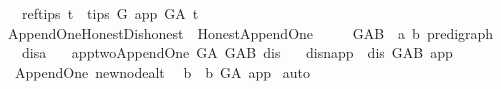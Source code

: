 \begin{isabellebody}
\ \ \ ref{\isacharunderscore}{\kern0pt}tips{\isacharcolon}{\kern0pt}\ {\isachardoublequoteopen}{\isasymforall}t\ {\isasymin}\ tips\ G{\isachardot}{\kern0pt}\ app\ {\isasymrightarrow}\isactrlbsub G{\isacharunderscore}{\kern0pt}A\isactrlesub \ t{\isachardoublequoteclose}\ \ \isanewline
\isanewline
\isanewline
{}\isamarkupfalse%
\ Append{\isacharunderscore}{\kern0pt}One{\isacharunderscore}{\kern0pt}Honest{\isacharunderscore}{\kern0pt}Dishonest\ {\isacharequal}{\kern0pt}\ Honest{\isacharunderscore}{\kern0pt}Append{\isacharunderscore}{\kern0pt}One\ {\isacharplus}{\kern0pt}\ \isanewline
\ \ \ G{\isacharunderscore}{\kern0pt}AB\ {\isacharcolon}{\kern0pt}{\isacharcolon}{\kern0pt}\ {\isachardoublequoteopen}{\isacharparenleft}{\kern0pt}{\isacharprime}{\kern0pt}a{\isacharcomma}{\kern0pt}\ {\isacharprime}{\kern0pt}b{\isacharparenright}{\kern0pt}\ pre{\isacharunderscore}{\kern0pt}digraph{\isachardoublequoteclose}\ {\isacharparenleft}{\kern0pt}\isanewline
\ \ \ dis{\isacharcolon}{\kern0pt}{\isacharcolon}{\kern0pt}{\isacharprime}{\kern0pt}a\isanewline
\ \ \ app{\isacharunderscore}{\kern0pt}two{\isacharcolon}{\kern0pt}{\isachardoublequoteopen}Append{\isacharunderscore}{\kern0pt}One\ G{\isacharunderscore}{\kern0pt}A\ G{\isacharunderscore}{\kern0pt}AB\ dis{\isachardoublequoteclose}\isanewline
\ \ \ dis{\isacharunderscore}{\kern0pt}n{\isacharunderscore}{\kern0pt}app{\isacharcolon}{\kern0pt}\ {\isachardoublequoteopen}{\isasymnot}\ dis\ {\isasymrightarrow}\isactrlbsub G{\isacharunderscore}{\kern0pt}AB\isactrlesub \ app{\isachardoublequoteclose}%
\isadelimdocument
%
\endisadelimdocument
%
\isatagdocument
%
\isamarkuptrue%
%
\endisatagdocument
{\isafolddocument}%
%
\isadelimdocument
%
\endisadelimdocument
{}\isamarkupfalse%
\ {\isacharparenleft}{\kern0pt}\ Append{\isacharunderscore}{\kern0pt}One{\isacharparenright}{\kern0pt}\ new{\isacharunderscore}{\kern0pt}node{\isacharunderscore}{\kern0pt}alt{\isacharcolon}{\kern0pt}\isanewline
\ \ {\isachardoublequoteopen}{\isacharparenleft}{\kern0pt}{\isasymforall}b{\isachardot}{\kern0pt}\ {\isasymnot}\ b\ {\isasymrightarrow}\isactrlbsub G{\isacharunderscore}{\kern0pt}A\isactrlesub \ app{\isacharparenright}{\kern0pt}{\isachardoublequoteclose}\ \isanewline
%
\isadelimproof
%
\endisadelimproof
%
\isatagproof
{}\isamarkupfalse%
{\isacharparenleft}{\kern0pt}auto{\isacharparenright}{\kern0pt}\isanewline

\end{isabellebody}
